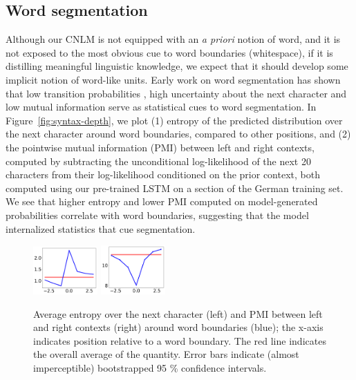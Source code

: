 \subsection{Word segmentation}
\label{sec:segmentation}

Although our CNLM is not equipped with an \emph{a priori} notion of
word, and it is not exposed to the most obvious cue to word boundaries
(whitespace), if it is distilling meaningful linguistic knowledge, we
expect that it should develop some implicit notion of word-like units.
Early work on word segmentation has shown that low transition
probabilities \cite{harris-distributional-1954, saffran-word-1996},
high uncertainty about the next character \cite{cohen-algorithm-2001,
  feng-accessor-2004} and low mutual information
\cite{sun-chinese-1998} serve as statistical cues to word
segmentation.  In Figure~\ref{fig:syntax-depth}, we plot (1) entropy
of the predicted distribution over the next character around word
boundaries, compared to other positions, and (2) the pointwise mutual
information (PMI) between left and right contexts, computed by
subtracting the unconditional log-likelihood of the next 20 characters
from their log-likelihood conditioned on the prior context, both computed
using our pre-trained LSTM on a section of the German training
set.  We see that higher entropy and lower PMI computed on
model-generated probabilities correlate with word boundaries,
suggesting that the model internalized statistics that cue segmentation.

\begin{figure}
	\begin{center}
\includegraphics[width=0.22\textwidth]{figures/segmentation-profile-flattened-entropies-english-ci.pdf}
\includegraphics[width=0.22\textwidth]{figures/segmentation-profile-flattened-pmis-english-ci.pdf}
	\end{center}
	\caption{Average entropy over the next character (left) and PMI between left and right contexts (right) around word boundaries (blue); the x-axis indicates position relative to a word boundary. The red line indicates the overall average of the quantity. Error bars indicate (almost imperceptible) bootstrapped 95 \% confidence intervals.}\label{fig:boundaries-entropy}
\end{figure}

